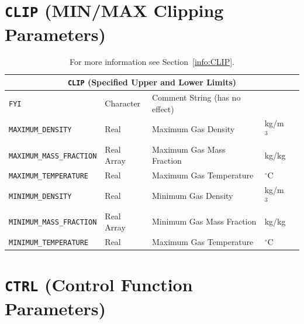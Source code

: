 \documentclass[11pt]{book}
\newcommand{\ct}{\tt\small}
\begin{document}
\section{\texorpdfstring{{\tt CLIP}}{CLIP} (MIN/MAX Clipping Parameters)}

\hspace{0.5in}

\begin{table}[H]
\caption{For more information see Section~\ref{info:CLIP}.}\label{tbl:CLIP}
\noindent
\begin{tabular*}{6.5in}{@{\extracolsep\fill}|l|l|l|l|l|}
\hline
\multicolumn{5}{|c|}{{\ct CLIP} (Specified Upper and Lower Limits)} \\ \hline \hline
{\ct FYI}                     & Character      & Comment String (has no effect)   &            &     \\ \hline
{\ct MAXIMUM\_DENSITY}        & Real           & Maximum Gas Density              & kg/m$^3$   &     \\ \hline
{\ct MAXIMUM\_MASS\_FRACTION} & Real Array     & Maximum Gas Mass Fraction        & kg/kg      &     \\ \hline
{\ct MAXIMUM\_TEMPERATURE}    & Real           & Maximum Gas Temperature          & $^\circ$C  &     \\ \hline
{\ct MINIMUM\_DENSITY}        & Real           & Minimum Gas Density              & kg/m$^3$   &     \\ \hline
{\ct MINIMUM\_MASS\_FRACTION} & Real Array     & Minimum Gas Mass Fraction        & kg/kg      &     \\ \hline
{\ct MINIMUM\_TEMPERATURE}    & Real           & Maximum Gas Temperature          & $^\circ$C  &     \\ \hline
\end{tabular*}
\end{table}

\vspace{\baselineskip}

\vfill


\section{\texorpdfstring{{\tt CTRL}}{CTRL} (Control Function Parameters)}

\hspace{0.5in}
\end{document}
